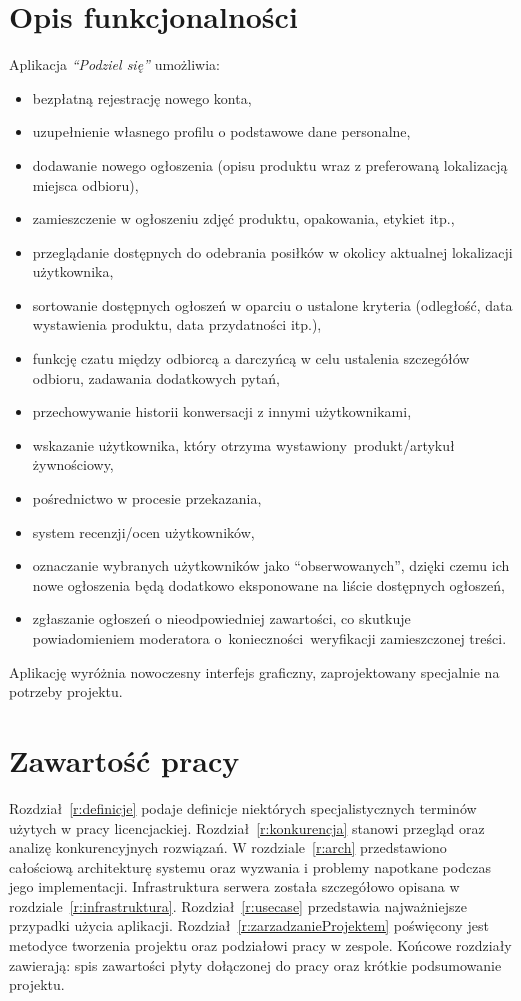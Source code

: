 \documentclass[licencjacka]{pracamgr}
\begin{document}
\section*{Opis funkcjonalności}
Aplikacja \textit{``Podziel się''} umożliwia:
\begin{itemize}
\setlength\itemsep{-0.2em}
\item bezpłatną rejestrację nowego konta,
\item uzupełnienie własnego profilu o podstawowe dane personalne,
\item dodawanie nowego ogłoszenia (opisu produktu wraz z preferowaną lokalizacją miejsca odbioru),
\item zamieszczenie w ogłoszeniu zdjęć produktu, opakowania, etykiet itp.,
\item przeglądanie dostępnych do odebrania posiłków w okolicy aktualnej lokalizacji użytkownika,
\item sortowanie dostępnych ogłoszeń w oparciu o ustalone kryteria (odległość, data wystawienia produktu, data przydatności itp.),
\item funkcję czatu między odbiorcą a darczyńcą w celu ustalenia szczegółów odbioru, zadawania dodatkowych pytań,
\item przechowywanie historii konwersacji z innymi użytkownikami,
\item wskazanie użytkownika, który otrzyma wystawiony~produkt/artykuł żywnościowy,
\item pośrednictwo w procesie przekazania, 
\item system recenzji/ocen użytkowników,
\item oznaczanie wybranych użytkowników jako ``obserwowanych'', dzięki czemu ich nowe ogłoszenia będą dodatkowo eksponowane na liście dostępnych ogłoszeń,
\item zgłaszanie ogłoszeń o nieodpowiedniej zawartości, co skutkuje powiadomieniem moderatora o~konieczności~weryfikacji zamieszczonej treści.
\end{itemize}
Aplikację wyróżnia nowoczesny interfejs graficzny, zaprojektowany specjalnie na potrzeby projektu.

\section*{Zawartość pracy}
Rozdział~\ref{r:definicje} podaje definicje niektórych specjalistycznych terminów użytych w pracy licencjackiej.
Rozdział~\ref{r:konkurencja} stanowi przegląd oraz analizę konkurencyjnych rozwiązań. W rozdziale~\ref{r:arch} przedstawiono całościową architekturę systemu oraz wyzwania i problemy napotkane podczas jego implementacji. Infrastruktura serwera została szczegółowo opisana w rozdziale~\ref{r:infrastruktura}. Rozdział~\ref{r:usecase} przedstawia najważniejsze przypadki użycia aplikacji.  Rozdział~\ref{r:zarzadzanieProjektem} poświęcony jest metodyce tworzenia projektu oraz podziałowi pracy w zespole. Końcowe rozdziały zawierają: spis zawartości płyty dołączonej do pracy oraz krótkie podsumowanie projektu.
\end{document}
